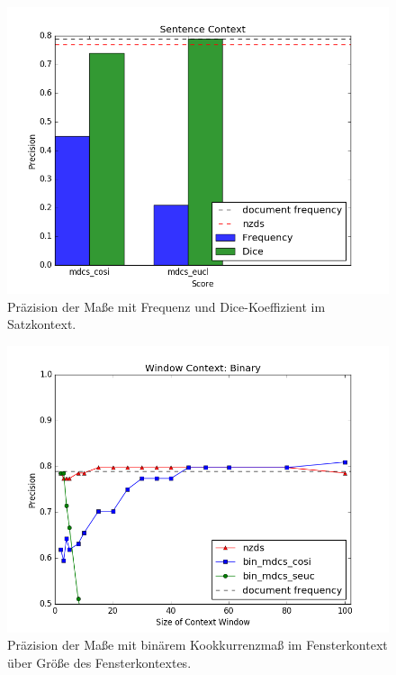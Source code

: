 \documentclass[11pt,numbers=noenddot]{scrartcl}
\begin{document}
\begin{figure}
    \includegraphics[width = \textwidth]{sent}
    \caption{Präzision der Maße mit Frequenz und Dice-Koeffizient im Satzkontext.}
    \label{sent}
\end{figure}
\begin{figure}
    \includegraphics[width = \textwidth]{win_bin}
    \caption{Präzision der Maße mit binärem Kookkurrenzmaß im Fensterkontext über Größe des Fensterkontextes.}
    \label{win_bin}
\end{figure}
\end{document}
